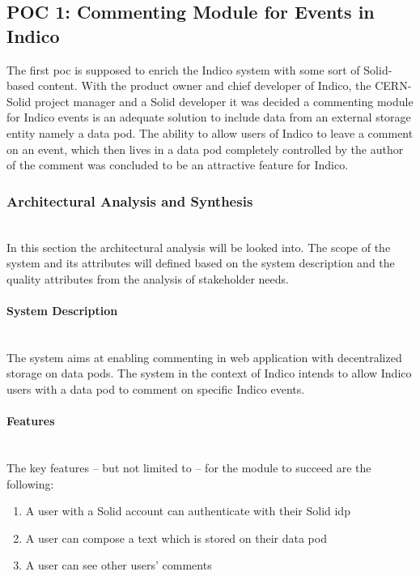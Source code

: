 \subsection{POC 1: Commenting Module for Events in Indico}

The first \gls{poc} is supposed to enrich the Indico system with some sort of Solid-based content. With the product owner and chief developer of Indico, the CERN-Solid project manager and a Solid developer it was decided a commenting module for Indico events is an adequate solution to include data from an external storage entity namely a data pod. The ability to allow users of Indico to leave a comment on an event, which then lives in a data pod completely controlled by the author of the comment was concluded to be an attractive feature for Indico.

\subsubsection{Architectural Analysis and Synthesis}\mbox{}\\

In this section the architectural analysis will be looked into. The scope of the system and its attributes will defined based on the system description and the quality attributes from the analysis of stakeholder needs.

\paragraph{System Description}\mbox{}\\

The system aims at enabling commenting in web application with decentralized storage on data pods. The system in the context of Indico intends to allow Indico users with a data pod to comment on specific Indico events.

\paragraph{Features}\mbox{}\\

The key features -- but not limited to -- for the module to succeed are the following:

\begin{enumerate}
    \item A user with a Solid account can authenticate with their Solid \gls{idp}
    \item A user can compose a text which is stored on their data pod
    \item A user can see other users’ comments
\end{enumerate}

